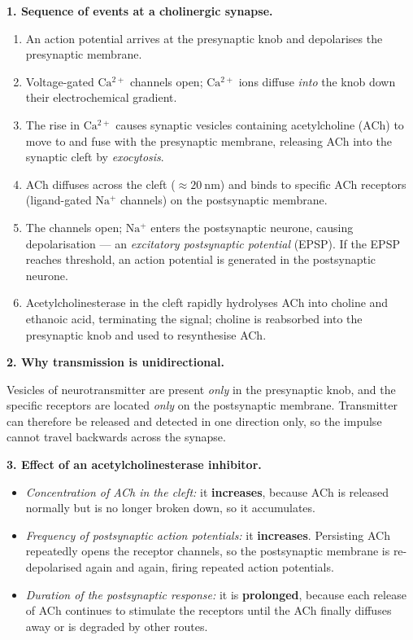 \documentclass[11pt]{article}
\newcommand{\cle}[1]{{\popxbold\color{popdark}#1}}
\begin{document}
\begin{corrige}
\textbf{1. Sequence of events at a cholinergic synapse.}
\begin{enumerate}
\item An action potential arrives at the presynaptic knob and depolarises the presynaptic membrane.
\item \cle{Voltage-gated $\mathrm{Ca^{2+}}$ channels} open; $\mathrm{Ca^{2+}}$ ions diffuse \emph{into} the knob down their electrochemical gradient.
\item The rise in $\mathrm{Ca^{2+}}$ causes synaptic \cle{vesicles} containing acetylcholine (ACh) to move to and fuse with the presynaptic membrane, releasing ACh into the synaptic cleft by \emph{exocytosis}.
\item ACh diffuses across the cleft ($\approx 20\ \mathrm{nm}$) and binds to specific \cle{ACh receptors} (ligand-gated $\mathrm{Na^+}$ channels) on the postsynaptic membrane.
\item The channels open; $\mathrm{Na^+}$ enters the postsynaptic neurone, causing depolarisation — an \emph{excitatory postsynaptic potential} (EPSP). If the EPSP reaches threshold, an action potential is generated in the postsynaptic neurone.
\item \cle{Acetylcholinesterase} in the cleft rapidly hydrolyses ACh into choline and ethanoic acid, terminating the signal; choline is reabsorbed into the presynaptic knob and used to resynthesise ACh.
\end{enumerate}

\textbf{2. Why transmission is unidirectional.}\par
Vesicles of neurotransmitter are present \emph{only} in the presynaptic knob, and the specific receptors are located \emph{only} on the postsynaptic membrane. Transmitter can therefore be released and detected in one direction only, so the impulse cannot travel backwards across the synapse.

\textbf{3. Effect of an acetylcholinesterase inhibitor.}
\begin{itemize}
\item \emph{Concentration of ACh in the cleft:} it \textbf{increases}, because ACh is released normally but is no longer broken down, so it accumulates.
\item \emph{Frequency of postsynaptic action potentials:} it \textbf{increases}. Persisting ACh repeatedly opens the receptor channels, so the postsynaptic membrane is re-depolarised again and again, firing repeated action potentials.
\item \emph{Duration of the postsynaptic response:} it is \textbf{prolonged}, because each release of ACh continues to stimulate the receptors until the ACh finally diffuses away or is degraded by other routes.
\end{itemize}


\end{corrige}
\end{document}

